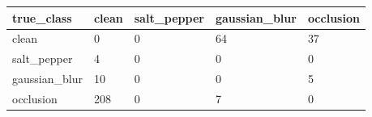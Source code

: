 \begin{tabular}{lllll}
\hline
true\_class & clean & salt\_pepper & gaussian\_blur & occlusion \\
\hline
clean & 0 & 0 & 64 & 37 \\
salt\_pepper & 4 & 0 & 0 & 0 \\
gaussian\_blur & 10 & 0 & 0 & 5 \\
occlusion & 208 & 0 & 7 & 0 \\
\hline
\end{tabular}
